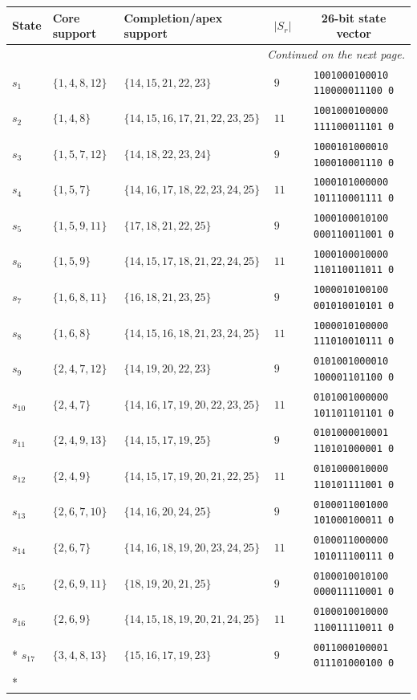 \documentclass[aps,pra,reprint,superscriptaddress,longbibliography,nofootinbib,floatfix,10pt]{revtex4-2}
\theoremstyle{definition}
\begin{document}
\begin{longtable}{llllc}
State & Core support & Completion/apex support & $|S_r|$ & 26-bit state vector \\\midrule
\endhead
\midrule
\multicolumn{5}{r}{\emph{Continued on the next page.}}\\
\endfoot
\bottomrule\endlastfoot
$s_{1}$ & $\{1,4,8,12\}$ & $\{14,15,21,22,23\}$ & $9$ & \texttt{1001000100010\,110000011100\,0} \\
$s_{2}$ & $\{1,4,8\}$ & $\{14,15,16,17,21,22,23,25\}$ & $11$ & \texttt{1001000100000\,111100011101\,0} \\
$s_{3}$ & $\{1,5,7,12\}$ & $\{14,18,22,23,24\}$ & $9$ & \texttt{1000101000010\,100010001110\,0} \\
$s_{4}$ & $\{1,5,7\}$ & $\{14,16,17,18,22,23,24,25\}$ & $11$ & \texttt{1000101000000\,101110001111\,0} \\
$s_{5}$ & $\{1,5,9,11\}$ & $\{17,18,21,22,25\}$ & $9$ & \texttt{1000100010100\,000110011001\,0} \\
$s_{6}$ & $\{1,5,9\}$ & $\{14,15,17,18,21,22,24,25\}$ & $11$ & \texttt{1000100010000\,110110011011\,0} \\
$s_{7}$ & $\{1,6,8,11\}$ & $\{16,18,21,23,25\}$ & $9$ & \texttt{1000010100100\,001010010101\,0} \\
$s_{8}$ & $\{1,6,8\}$ & $\{14,15,16,18,21,23,24,25\}$ & $11$ & \texttt{1000010100000\,111010010111\,0} \\
$s_{9}$ & $\{2,4,7,12\}$ & $\{14,19,20,22,23\}$ & $9$ & \texttt{0101001000010\,100001101100\,0} \\
$s_{10}$ & $\{2,4,7\}$ & $\{14,16,17,19,20,22,23,25\}$ & $11$ & \texttt{0101001000000\,101101101101\,0} \\
$s_{11}$ & $\{2,4,9,13\}$ & $\{14,15,17,19,25\}$ & $9$ & \texttt{0101000010001\,110101000001\,0} \\
$s_{12}$ & $\{2,4,9\}$ & $\{14,15,17,19,20,21,22,25\}$ & $11$ & \texttt{0101000010000\,110101111001\,0} \\
$s_{13}$ & $\{2,6,7,10\}$ & $\{14,16,20,24,25\}$ & $9$ & \texttt{0100011001000\,101000100011\,0} \\
$s_{14}$ & $\{2,6,7\}$ & $\{14,16,18,19,20,23,24,25\}$ & $11$ & \texttt{0100011000000\,101011100111\,0} \\
$s_{15}$ & $\{2,6,9,11\}$ & $\{18,19,20,21,25\}$ & $9$ & \texttt{0100010010100\,000011110001\,0} \\
$s_{16}$ & $\{2,6,9\}$ & $\{14,15,18,19,20,21,24,25\}$ & $11$ & \texttt{0100010010000\,110011110011\,0} \\*
$s_{17}$ & $\{3,4,8,13\}$ & $\{15,16,17,19,23\}$ & $9$ & \texttt{0011000100001\,011101000100\,0} \\*

\end{longtable}
\end{document}
